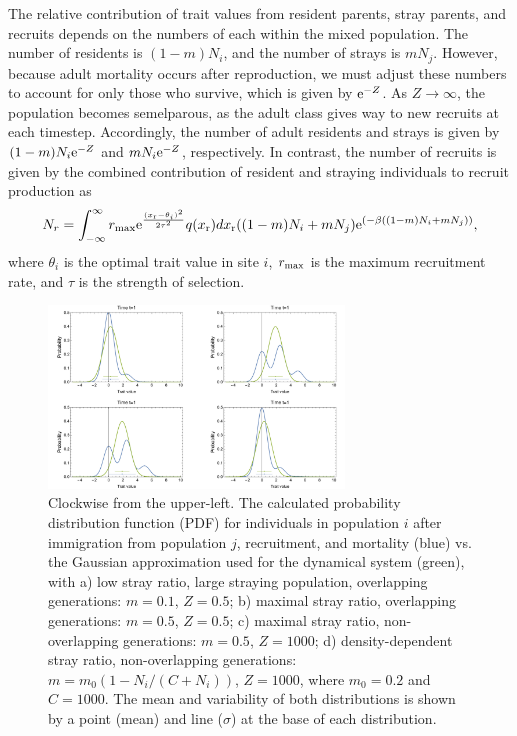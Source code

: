 \documentclass{revtex4}
\begin{document}
The relative contribution of trait values from resident parents, stray parents, and recruits depends on the numbers of each within the mixed population.
The number of residents is $(1-m)N_i$, and the number of strays is $mN_j$.
However, because adult mortality occurs after reproduction, we must adjust these numbers to account for only those who survive, which is given by ${\rm e}^{-Z}$.
As $Z\rightarrow \infty$, the population becomes semelparous, as the adult class gives way to new recruits at each timestep. 
Accordingly, the number of adult residents and strays is given by $(1-m)N_i{\rm e}^{-Z}$ and  $mN_i{\rm e}^{-Z}$, respectively.
In contrast, the number of recruits is given by the combined contribution of resident and straying individuals to recruit production as 
\begin{equation}
N_r = \int_{-\infty}^{\infty}r_{\rm max}{\rm e}^{\frac{(x_{\rm r}-\theta_i)^2}{2\tau^2}}q(x_{\rm r})dx_{\rm r}((1-m)N_i + mN_j){\rm e}^{(-\beta((1-m)N_i + mN_j))},
\end{equation}
where $\theta_i$ is the optimal trait value in site $i$, $r_{\rm max}$ is the maximum recruitment rate, and $\tau$ is the strength of selection.

\begin{figure}
  \captionsetup{justification=raggedright,
singlelinecheck=false
}
\centering
\includegraphics[width=0.7\textwidth]{fig_PDF.pdf}
\caption{
Clockwise from the upper-left. The calculated probability distribution function (PDF) for individuals in population $i$ after immigration from population $j$, recruitment, and mortality (blue) vs. the Gaussian approximation used for the dynamical system (green), with
a) low stray ratio, large straying population, overlapping generations: $m=0.1$, $Z=0.5$;
b) maximal stray ratio, overlapping generations: $m=0.5$, $Z=0.5$;
c) maximal stray ratio, non-overlapping generations: $m=0.5$, $Z=1000$;
d) density-dependent stray ratio, non-overlapping generations: $m=m_0(1-N_i/(C+N_i))$, $Z=1000$, where $m_0=0.2$ and $C=1000$.
The mean and variability of both distributions is shown by a point (mean) and line ($\sigma$) at the base of each distribution.
} \label{fig:PDF}
\end{figure}
\end{document}
